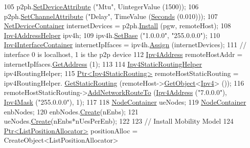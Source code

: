 \begin{DoxyCode}
105   p2ph.\hyperlink{classns3_1_1PointToPointHelper_a4577f5ab8c387e5528af2e0fbab1152e}{SetDeviceAttribute} (\textcolor{stringliteral}{"Mtu"}, UintegerValue (1500));
106   p2ph.\hyperlink{classns3_1_1PointToPointHelper_a6b5317fd17fb61e5a53f8d66a90b63b9}{SetChannelAttribute} (\textcolor{stringliteral}{"Delay"}, TimeValue (\hyperlink{group__timecivil_ga33c34b816f8ff6628e33d5c8e9713b9e}{Seconds} (0.010)));
107   \hyperlink{classns3_1_1NetDeviceContainer}{NetDeviceContainer} internetDevices = p2ph.\hyperlink{classns3_1_1PointToPointHelper_ab9162fea3e88722666fed1106df1f9ec}{Install} (pgw, remoteHost);
108   \hyperlink{classns3_1_1Ipv4AddressHelper}{Ipv4AddressHelper} ipv4h;
109   ipv4h.\hyperlink{classns3_1_1Ipv4AddressHelper_acf7b16dd25bac67e00f5e25f90a9a035}{SetBase} (\textcolor{stringliteral}{"1.0.0.0"}, \textcolor{stringliteral}{"255.0.0.0"});
110   \hyperlink{classns3_1_1Ipv4InterfaceContainer}{Ipv4InterfaceContainer} internetIpIfaces = ipv4h.\hyperlink{classns3_1_1Ipv4AddressHelper_af8e7f4a1a7e74c00014a1eac445a27af}{Assign} (internetDevices);
111   \textcolor{comment}{// interface 0 is localhost, 1 is the p2p device}
112   \hyperlink{classns3_1_1Ipv4Address}{Ipv4Address} remoteHostAddr = internetIpIfaces.\hyperlink{classns3_1_1Ipv4InterfaceContainer_ae63208dcd222be986822937ee4aa828c}{GetAddress} (1);
113 
114   \hyperlink{classns3_1_1Ipv4StaticRoutingHelper}{Ipv4StaticRoutingHelper} ipv4RoutingHelper;
115   \hyperlink{classns3_1_1Ptr}{Ptr<Ipv4StaticRouting>} remoteHostStaticRouting = ipv4RoutingHelper.
      \hyperlink{classns3_1_1Ipv4StaticRoutingHelper_a731206e50d305695dac7fb2ef963a4bb}{GetStaticRouting} (remoteHost->\hyperlink{classns3_1_1Object_a13e18c00017096c8381eb651d5bd0783}{GetObject}<\hyperlink{classns3_1_1Ipv4}{Ipv4}> ());
116   remoteHostStaticRouting->\hyperlink{classns3_1_1Ipv4StaticRouting_a8bf5eaa7ba49fe33c78c70d5560b6c39}{AddNetworkRouteTo} (\hyperlink{classns3_1_1Ipv4Address}{Ipv4Address} (\textcolor{stringliteral}{"7.0.0.0"}), 
      \hyperlink{classns3_1_1Ipv4Mask}{Ipv4Mask} (\textcolor{stringliteral}{"255.0.0.0"}), 1);
117 
118   \hyperlink{classns3_1_1NodeContainer}{NodeContainer} ueNodes;
119   \hyperlink{classns3_1_1NodeContainer}{NodeContainer} enbNodes;
120   enbNodes.\hyperlink{classns3_1_1NodeContainer_a787f059e2813e8b951cc6914d11dfe69}{Create}(nEnbs);
121   ueNodes.\hyperlink{classns3_1_1NodeContainer_a787f059e2813e8b951cc6914d11dfe69}{Create}(nEnbs*nUesPerEnb);
122 
123   \textcolor{comment}{// Install Mobility Model}
124   \hyperlink{classns3_1_1Ptr}{Ptr<ListPositionAllocator>} positionAlloc = CreateObject<ListPositionAllocator> 

\end{DoxyCode}
